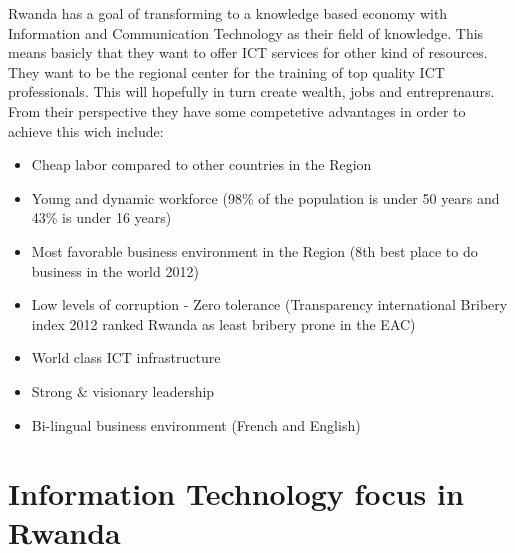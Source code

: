 Rwanda has a goal of transforming to a knowledge based economy with Information and Communication Technology as their field of knowledge. This means basicly that they want to offer ICT services for other kind of resources. 
They want to be the regional center for the training of top quality ICT professionals.
This will hopefully in turn create wealth, jobs and entreprenaurs. From their perspective they have some competetive advantages in order to achieve this wich include:
\begin{itemize}
\item Cheap labor compared to other countries in the Region
\item Young and dynamic workforce (98\% of the population is under 50 years and 43\% is under 16 years)
\item Most favorable business environment in the Region (8th best place to do business in the world 2012)
\item Low levels of corruption - Zero tolerance (Transparency international Bribery index 2012 ranked Rwanda as least bribery prone in the EAC)
\item World class ICT infrastructure
\item Strong \& visionary leadership
\item Bi-lingual business environment (French and English)
\end{itemize}
\cite{2}

\section{Information Technology focus in Rwanda}

